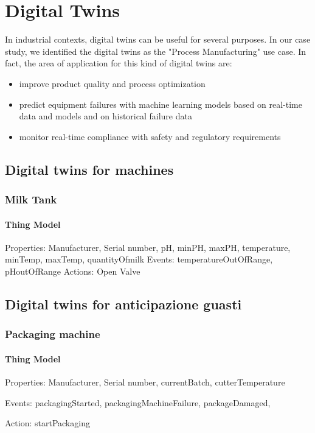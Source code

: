 \chapter{Digital Twins}
In industrial contexts, digital twins can be useful for several purposes.
In our case study, we identified the digital twins as the "Process Manufacturing" use case.
In fact, the area of application for this kind of digital twins are:
\begin{itemize}
    \item improve product quality and process optimization
    \item predict equipment failures with machine learning models based on real-time data and models and on historical failure data
    \item monitor real-time compliance with safety and regulatory requirements
\end{itemize}

\section{Digital twins for machines}
\subsection{Milk Tank}
\subsubsection{Thing Model}
Properties: Manufacturer, Serial number, pH, minPH, maxPH, temperature, minTemp, maxTemp, quantityOfmilk
Events: temperatureOutOfRange, pHoutOfRange
Actions: Open Valve

\section{Digital twins for anticipazione guasti}
\subsection{Packaging machine}
\subsubsection{Thing Model}
Properties: Manufacturer, Serial number, currentBatch, cutterTemperature

Events: packagingStarted, packagingMachineFailure, packageDamaged,

Action: startPackaging

